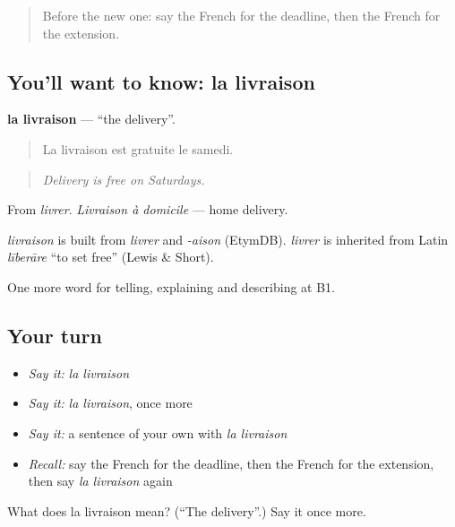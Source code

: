 \label{lesson:FR-C359-livraison}



\begin{quote}
Before the new one: say the French for the deadline, then the French for the extension.
\end{quote}

\subsection*{You'll want to know: la livraison}
\textbf{la livraison} — \textquotedblleft{}the delivery\textquotedblright{}.

\begin{quote}
La livraison est gratuite le samedi.
\end{quote}

\begin{quote}
\emph{Delivery is free on Saturdays.}
\end{quote}

From \emph{livrer}. \emph{Livraison à domicile} — home delivery.

\begin{cousinweb}
\emph{livraison} is built from \emph{livrer} and \emph{-aison} (EtymDB). \emph{livrer} is inherited from Latin \emph{līberāre} \textquotedblleft{}to set free\textquotedblright{} (Lewis \& Short).
\end{cousinweb}

\begin{grammarlens}[title={What you've built}]
One more word for telling, explaining and describing at B1.
\end{grammarlens}

\subsection*{Your turn}
\begin{itemize}
\raggedright
  \item \emph{Say it:} \emph{la livraison}
  \item \emph{Say it:} \emph{la livraison}, once more
  \item \emph{Say it:} a sentence of your own with \emph{la livraison}
  \item \emph{Recall:} say the French for the deadline, then the French for the extension, then say \emph{la livraison} again
\end{itemize}

\begin{tcolorbox}[breakable,colback=teal!4,colframe=teal!35!black,title={Before you move on}]
What does la livraison mean? (\textquotedblleft{}The delivery\textquotedblright{}.) Say it once more.
\end{tcolorbox}
